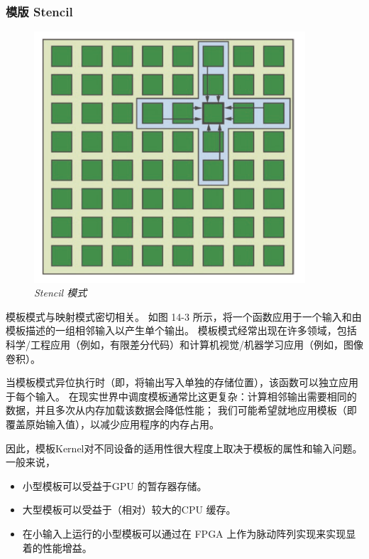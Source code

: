 \subsubsection{模版 Stencil}
\begin{figure}[H]
	\centering
	\includegraphics[width=0.9\textwidth]{figs/F14.3.png}
	\caption{\textit{Stencil 模式 }}
\end{figure}

模板模式与映射模式密切相关。 如图 14-3 所示，将一个函数应用于一个输入和由模板描述的一组相邻输入以产生单个输出。 
模板模式经常出现在许多领域，包括科学/工程应用（例如，有限差分代码）和计算机视觉/机器学习应用（例如，图像卷积）。

当模板模式异位执行时（即，将输出写入单独的存储位置），该函数可以独立应用于每个输入。 
在现实世界中调度模板通常比这更复杂：计算相邻输出需要相同的数据，并且多次从内存加载该数据会降低性能； 
我们可能希望就地应用模板（即覆盖原始输入值），以减少应用程序的内存占用。

因此，模板Kernel对不同设备的适用性很大程度上取决于模板的属性和输入问题。 一般来说，

\begin{itemize}
	\item 小型模板可以受益于GPU 的暂存器存储。

	\item 大型模板可以受益于（相对）较大的CPU 缓存。

	\item 在小输入上运行的小型模板可以通过在 FPGA 上作为脉动阵列实现来实现显着的性能增益。
\end{itemize}

